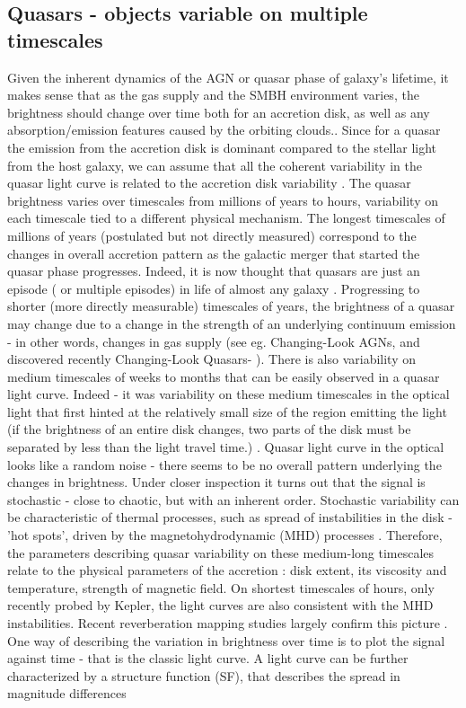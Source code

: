 \documentclass[modern]{aastex62}
\begin{document}
\subsection{Quasars - objects variable on multiple timescales }
Given the inherent dynamics of the AGN or quasar phase of galaxy's lifetime, it makes sense that as the gas supply and the SMBH environment varies, the brightness should change over time both for an accretion disk, as well as any absorption/emission features caused by the orbiting clouds.\cite{stern2017, schawinski2015}.  Since for a quasar the emission from the accretion disk is dominant compared to the stellar light from the host galaxy, we can assume that all the coherent variability  in the quasar light curve is related to the accretion disk variability . The quasar brightness varies over timescales from millions of years to hours, variability on each timescale tied to a different physical mechanism.  The longest timescales of millions of years (postulated but not directly measured) correspond to the changes in overall accretion pattern as the galactic merger that started the quasar phase progresses.  Indeed, it is now thought that quasars are just an episode ( or multiple episodes) in life of almost any galaxy \citep{alexander2012, kormendy2013}. Progressing to shorter (more directly measurable) timescales of years, the brightness of a  quasar may change due to a change in the strength of an underlying continuum emission - in other words, changes in gas supply (see eg. Changing-Look AGNs, and discovered recently Changing-Look Quasars- \cite{ruan2016, macleod2016, graham2017}). There is also variability on medium timescales of weeks to months that can be easily observed in a quasar light curve. Indeed - it was variability on these medium timescales  in the optical light that first hinted at the relatively small size of the region emitting the light (if the brightness of an entire disk changes, two parts of the disk must be separated by less than the light travel time.) \cite{mudd2017, blackburne2011, morgan2010}. Quasar light curve in the optical looks like a random noise - there seems to be no overall pattern underlying the changes in brightness. Under closer inspection it turns out that the signal is stochastic - close to chaotic, but with an inherent order. Stochastic variability can be characteristic of thermal processes, such as spread of instabilities in the disk - 'hot spots', driven by the magnetohydrodynamic (MHD) processes \citep{kelly2007, zu2013, kozlowski2016a}. Therefore, the parameters describing quasar variability on these medium-long timescales relate to the physical parameters of the accretion : disk extent, its viscosity and temperature, strength of magnetic field. On shortest timescales of hours, only recently probed by Kepler, the light curves are also consistent with  the MHD instabilities\citep{dexter2011, kasliwal2015a, aranzana2018, smith2018}. Recent reverberation mapping studies largely confirm this picture \citep{sun2015}. One way of describing the variation in brightness over time is to plot the signal against time - that is the classic light curve.  A light curve can be further characterized by a structure function (SF), that describes the spread in magnitude differences 
\end{document}
